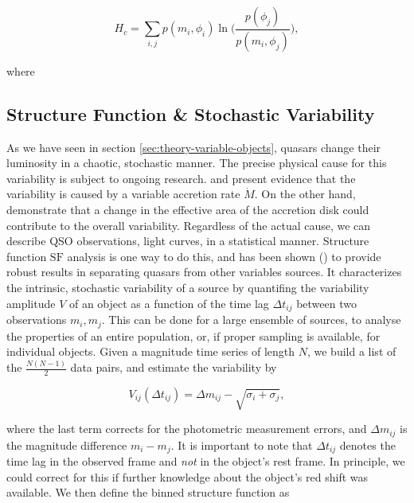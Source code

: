 \begin{equation}
H_c = \sum_{i,j} p(m_i, \phi_i) \ln\big(\frac{p(\phi_j)}{p(m_i, \phi_j)}\big),
\end{equation}

where 




\subsection{Structure Function \& Stochastic Variability}
\label{subsec:structure-function}

As we have seen in section \ref{sec:theory-variable-objects}, quasars change their luminosity in a chaotic, stochastic manner. The precise physical cause for this variability is subject to ongoing research. \citet{pereyra2006} and \citet{li2008} present evidence that the variability is caused by a variable accretion rate $\dot M$. On the other hand, \citet{blackburne2010} demonstrate that a change in the effective area of the accretion disk could contribute to the overall variability. Regardless of the actual cause, we can describe QSO observations, \eg light curves, in a statistical manner. Structure function $\text{SF}$ analysis \citep{hughes1992,collier2001} is one way to do this, and has been shown (\eg \citet{schmidt2010}) to provide robust results in separating quasars from other variables sources. It characterizes the intrinsic, stochastic variability of a source by quantifing the variability amplitude $V$ of an object as a function of the time lag $\Delta t_{ij}$ between two observations $m_i, m_j$. This can be done for a large ensemble of sources, to analyse the properties of an entire population, or, if proper sampling is available, for individual objects. Given a magnitude time series of length $N$, we build a list of the $\frac{N(N-1)}{2}$ data pairs, and estimate the variability by

\begin{equation}
V_{ij}(\Delta t_{ij}) = \Delta m_{ij} - \sqrt{\sigma_i + \sigma_j},
\end{equation}

where the last term corrects for the photometric measurement errors, and $\Delta m_{ij}$ is the magnitude difference $m_i - m_j$. It is important to note that $\Delta t_{ij}$ denotes the time lag in the observed frame and \emph{not} in the object's rest frame. In principle, we could correct for this if further knowledge about the object's red shift was available. We then define the binned structure function as


